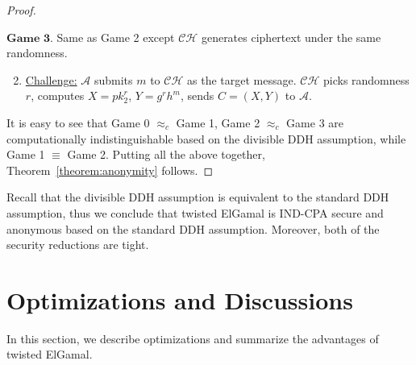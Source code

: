 \documentclass[a4paper,10pt]{article}
\begin{document}
\begin{proof}
\begin{trivlist}
\item $\textbf{Game 3.}$ Same as Game 2 except $\mathcal{CH}$ generates ciphertext under the same randomness.  

\begin{enumerate}\setcounter{enumi}{1}
\item \underline{Challenge:} $\mathcal{A}$ submits $m$ to $\mathcal{CH}$ as the target message. 
    $\mathcal{CH}$ picks randomness $r$, computes $X = pk_2^r$, $Y = g^r h^m$, sends $C = (X, Y)$ to $\mathcal{A}$.   
\end{enumerate}
\end{trivlist}

It is easy to see that Game 0 $\approx_c$ Game 1, Game 2 $\approx_c$ Game 3 
are computationally indistinguishable based on the divisible DDH assumption, while Game 1 $\equiv$ Game 2. 
Putting all the above together, Theorem~\ref{theorem:anonymity} follows.  
\end{proof}

Recall that the divisible DDH assumption is equivalent to the standard DDH assumption, 
thus we conclude that twisted ElGamal is IND-CPA secure and anonymous based on the standard DDH assumption. 
Moreover, both of the security reductions are tight. 



\section{Optimizations and Discussions}\label{sec:discussions}
In this section, we describe optimizations and summarize the advantages of twisted ElGamal. 
\end{document}
